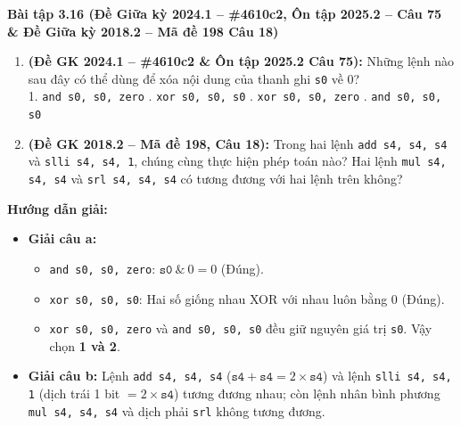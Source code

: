 \textbf{Bài tập 3.16 (Đề Giữa kỳ 2024.1 -- \#4610c2, Ôn tập 2025.2 -- Câu 75 \& Đề Giữa kỳ 2018.2 -- Mã đề 198 Câu 18)}
\begin{enumerate}[label=\alph*)]
    \item \textbf{(Đề GK 2024.1 -- \#4610c2 \& Ôn tập 2025.2 Câu 75):} Những lệnh nào sau đây có thể dùng để xóa nội dung của thanh ghi \texttt{s0} về 0?\\
    1. \texttt{and s0, s0, zero} . \texttt{xor s0, s0, s0} . \texttt{xor s0, s0, zero} . \texttt{and s0, s0, s0}
    \item \textbf{(Đề GK 2018.2 -- Mã đề 198, Câu 18):} Trong hai lệnh \texttt{add s4, s4, s4} và \texttt{slli s4, s4, 1}, chúng cùng thực hiện phép toán nào? Hai lệnh \texttt{mul s4, s4, s4} và \texttt{srl s4, s4, s4} có tương đương với hai lệnh trên không?
\end{enumerate}
\textbf{Hướng dẫn giải:}
\begin{itemize}
    \item \textbf{Giải câu a:}
    \begin{itemize}
        \item \texttt{and s0, s0, zero}: $\texttt{s0} \ \& \ 0 = 0$ (Đúng).
        \item \texttt{xor s0, s0, s0}: Hai số giống nhau XOR với nhau luôn bằng $0$ (Đúng).
        \item \texttt{xor s0, s0, zero} và \texttt{and s0, s0, s0} đều giữ nguyên giá trị \texttt{s0}. Vậy chọn \textbf{1 và 2}.
    \end{itemize}
    \item \textbf{Giải câu b:} Lệnh \texttt{add s4, s4, s4} ($\texttt{s4} + \texttt{s4} = 2 \times \texttt{s4}$) và lệnh \texttt{slli s4, s4, 1} (dịch trái 1 bit $= 2 \times \texttt{s4}$) tương đương nhau; còn lệnh nhân bình phương \texttt{mul s4, s4, s4} và dịch phải \texttt{srl} không tương đương.
\end{itemize}

